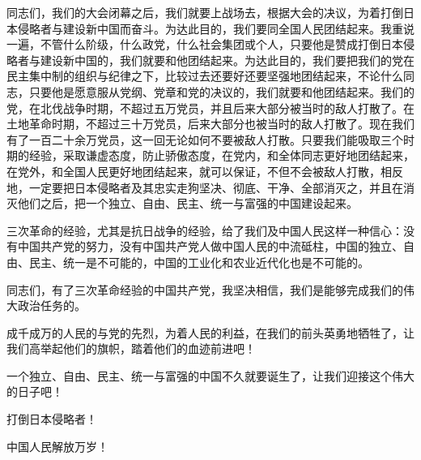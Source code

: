 同志们，我们的大会闭幕之后，我们就要上战场去，根据大会的决议，为着打倒日本侵略者与建设新中国而奋斗。为达此目的，我们要同全国人民团结起来。我重说一遍，不管什么阶级，什么政党，什么社会集团或个人，只要他是赞成打倒日本侵略者与建设新中国的，我们就要和他团结起来。为达此目的，我们要把我们的党在民主集中制的组织与纪律之下，比较过去还要好还要坚强地团结起来，不论什么同志，只要他是愿意服从党纲、党章和党的决议的，我们就要和他团结起来。我们的党，在北伐战争时期，不超过五万党员，并且后来大部分被当时的敌人打散了。在土地革命时期，不超过三十万党员，后来大部分也被当时的敌人打散了。现在我们有了一百二十余万党员，这一回无论如何不要被敌人打散。只要我们能吸取三个时期的经验，采取谦虚态度，防止骄傲态度，在党内，和全体同志更好地团结起来，在党外，和全国人民更好地团结起来，就可以保证，不但不会被敌人打散，相反地，一定要把日本侵略者及其忠实走狗坚决、彻底、干净、全部消灭之，并且在消灭他们之后，把一个独立、自由、民主、统一与富强的中国建设起来。

三次革命的经验，尤其是抗日战争的经验，给了我们及中国人民这样一种信心：没有中国共产党的努力，没有中国共产党人做中国人民的中流砥柱，中国的独立、自由、民主、统一是不可能的，中国的工业化和农业近代化也是不可能的。

同志们，有了三次革命经验的中国共产党，我坚决相信，我们是能够完成我们的伟大政治任务的。

成千成万的人民的与党的先烈，为着人民的利益，在我们的前头英勇地牺牲了，让我们高举起他们的旗帜，踏着他们的血迹前进吧！

一个独立、自由、民主、统一与富强的中国不久就要诞生了，让我们迎接这个伟大的日子吧！

打倒日本侵略者！

中国人民解放万岁！
